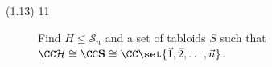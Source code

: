 \documentclass{math174}
\date{Wednesday, February 22}
\author{}
\begin{document}
\begin{description}
\item[(1.13) 11] Find \(H \le \mathcal S_n\) and a set of tabloids
  \(S\) such that
  \(\CC \mathcal H \cong \CC \mathbf S \cong \CC \set{\vec 1, \vec 2,
    \dots, \vec n}\).

  \begin{solution}

  \end{solution}
\end{description}
\end{document}
